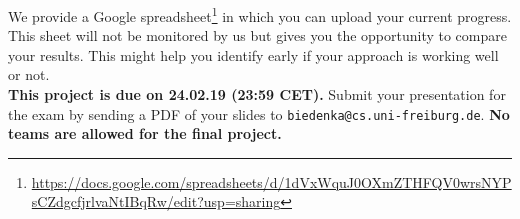 \documentclass[10pt,a4paper]{article}
\newcommand{\duedate}{24.02.19 (23:59 CET)}
\newcommand{\due}{{\bf This project is due on \duedate.} }
\begin{document}
		We provide a Google spreadsheet\footnote{\url{https://docs.google.com/spreadsheets/d/1dVxWquJ0OXmZTHFQV0wrsNYPsCZdgcfjrlvaNtIBqRw/edit?usp=sharing}} in which you can upload your current progress. This sheet will not be monitored by us but gives you the opportunity to compare your results. This might help you identify early if your approach is working well or not.
\vspace*{\fill}\\
\noindent
\due Submit your presentation for the exam by sending a PDF of your slides to \texttt{biedenka@cs.uni-freiburg.de}. \textbf{No teams are allowed for the final project.}
\end{document}
